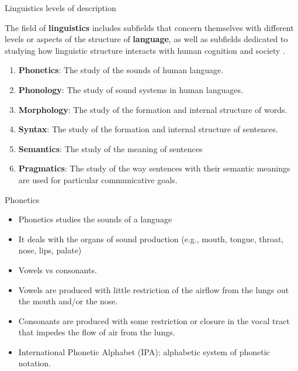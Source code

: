 \documentclass[handout]{beamer}
\begin{document}
\begin{frame}{Linguistics levels of description}
\begin{scriptsize}
The field of \textbf{linguistics} includes subfields that concern themselves with different levels or aspects of the structure of \textbf{language}, as well as subfields dedicated to studying how linguistic structure interacts with human cognition and society \cite{bender2013linguistic}.
\begin{enumerate}
 \item \textbf{Phonetics}: The study of the sounds of human language.
 \item \textbf{Phonology}: The study of sound systems in human languages.
 \item \textbf{Morphology}: The study of the formation and internal structure of words.
 \item \textbf{Syntax}: The study of the formation and internal structure of sentences.
 \item \textbf{Semantics}: The study of the meaning of sentences
 \item \textbf{Pragmatics}: The study of the way sentences with their semantic meanings are
used for particular communicative goals.
\end{enumerate}


\end{scriptsize}
\end{frame}



\begin{frame}{Phonetics}
\scriptsize{
\begin{itemize}
 \item Phonetics studies the sounds of a language \cite{JohnsonMLSS}
 \item It deals with the organs of sound production (e.g., mouth, tongue, throat, nose, lips, palate)
\item Vowels vs consonants.
\item Vowels are produced with little restriction of the airflow from the lungs out
the mouth and/or the nose. \cite{fromkin2018introduction}
\item Consonants are produced with some restriction or closure in the vocal tract that
impedes the flow of air from the lungs. \cite{fromkin2018introduction}
\item International Phonetic Alphabet (IPA):  alphabetic system of phonetic notation. 


\end{itemize}
}
\end{frame}
\end{document}
